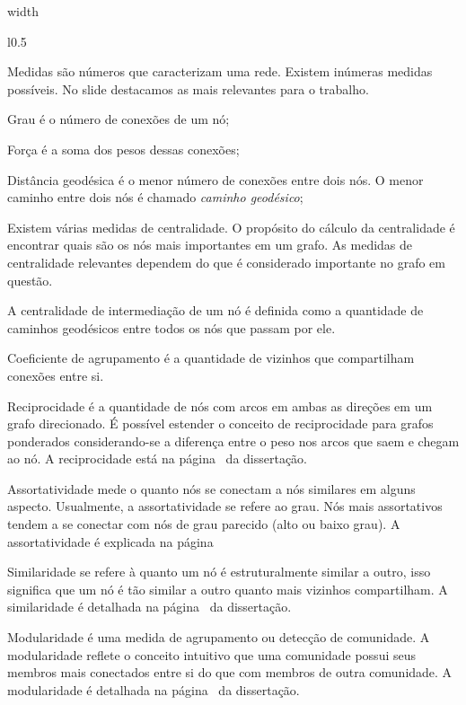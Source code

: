 \documentclass[10pt,a4paper,final]{article}
\newcommand\disappearingrule{%
  \par %
  \vskip10pt %
  \leaders\vrule width \textwidth\vskip0.4pt %
  \nointerlineskip %
  \vskip10pt %
}
\begin{document}
\disappearingrule

\begin{minipage}[t]{\linewidth}
  \begin{wrapfigure}{l}{0.5\textwidth}
  \end{wrapfigure}
  
  Medidas são números que caracterizam uma rede. Existem inúmeras medidas possíveis. No slide destacamos as mais relevantes para o trabalho.
  
  Grau é o número de conexões de um nó;
  
  Força é a soma dos pesos dessas conexões;
  
  Distância geodésica é o menor número de conexões entre dois nós. O menor caminho entre dois nós é chamado \textit{caminho geodésico};
  
  Existem várias medidas de centralidade. O propósito do cálculo da centralidade é encontrar quais são os nós mais importantes em um grafo. As medidas de centralidade relevantes dependem do que é considerado importante no grafo em questão.
  
  A centralidade de intermediação de um nó é definida como a quantidade de caminhos geodésicos entre todos os nós que passam por ele.
  
  Coeficiente de agrupamento é a quantidade de vizinhos que compartilham conexões entre si.
  
  Reciprocidade é a quantidade de nós com arcos em ambas as direções em um grafo direcionado. É possível estender o conceito de reciprocidade para grafos ponderados considerando-se a diferença entre o peso nos arcos que saem e chegam ao nó. A reciprocidade está na página~\pageref{sec:reciprocidade} da dissertação.
  
  Assortatividade mede o quanto nós se conectam a nós similares em alguns aspecto. Usualmente, a assortatividade se refere ao grau. Nós mais assortativos tendem a se conectar com nós de grau parecido (alto ou baixo grau). A assortatividade é explicada na página~\pageref{sec:assortatividade}
  
  Similaridade se refere à quanto um nó é estruturalmente similar a outro, isso significa que um nó é tão similar a outro quanto mais vizinhos compartilham. A similaridade é detalhada na página~\pageref{sec:similaridade} da dissertação.
  
  Modularidade é uma medida de agrupamento ou detecção de comunidade. A modularidade reflete o conceito intuitivo que uma comunidade possui seus membros mais conectados entre si do que com membros de outra comunidade. A modularidade é detalhada na página~\pageref{sec:modularidade} da dissertação.
\end{minipage}
\end{document}
